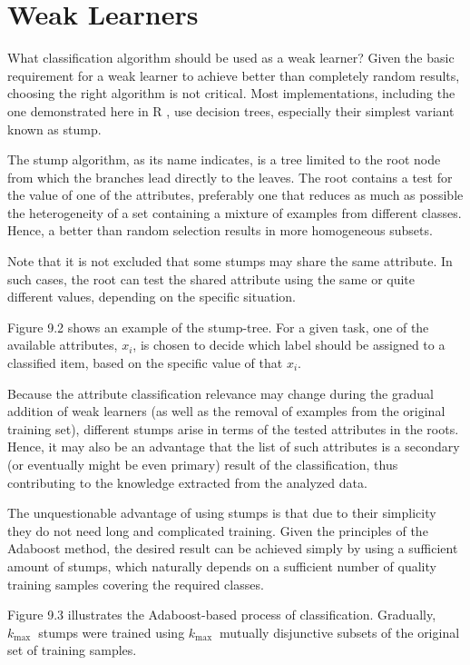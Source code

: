 \section{Weak Learners}
What classification algorithm should be used as a weak learner? Given the basic requirement for a weak learner to achieve better than completely random results, choosing the right algorithm is not critical. Most implementations, including the one demonstrated here in R , use decision trees, especially their simplest variant known as stump.

The stump algorithm, as its name indicates, is a tree limited to the root node from which the branches lead directly to the leaves. The root contains a test for the value of one of the attributes, preferably one that reduces as much as possible the heterogeneity of a set containing a mixture of examples from different classes. Hence, a better than random selection results in more homogeneous subsets.

Note that it is not excluded that some stumps may share the same attribute. In such cases, the root can test the shared attribute using the same or quite different values, depending on the specific situation.

Figure 9.2 shows an example of the stump-tree. For a given task, one of the available attributes, $x_{i}$, is chosen to decide which label should be assigned to a classified item, based on the specific value of that $x_{i}$.

Because the attribute classification relevance may change during the gradual addition of weak learners (as well as the removal of examples from the original training set), different stumps arise in terms of the tested attributes in the roots. Hence, it may also be an advantage that the list of such attributes is a secondary (or eventually might be even primary) result of the classification, thus contributing to the knowledge extracted from the analyzed data.

The unquestionable advantage of using stumps is that due to their simplicity they do not need long and complicated training. Given the principles of the Adaboost method, the desired result can be achieved simply by using a sufficient amount of stumps, which naturally depends on a sufficient number of quality training samples covering the required classes.

Figure 9.3 illustrates the Adaboost-based process of classification. Gradually, $k_{\text {max }}$ stumps were trained using $k_{\text {max }}$ mutually disjunctive subsets of the original set of training samples.

